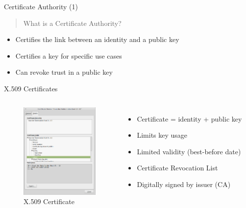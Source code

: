 \documentclass[aspectratio=169]{beamer}
\begin{document}
    \begin{frame}{Certificate Authority (1)}
        \begin{quote}
            \centering
            What is a Certificate Authority?
        \end{quote}
        \pause
        \begin{itemize}
            \item Certifies the link between an identity and a public key
            \pause
            \item Certifies a key for specific use cases
            \pause
            \item Can revoke trust in a public key
        \end{itemize}
    \end{frame}

    \begin{frame}{X.509 Certificates}
        \begin{columns}[T,onlytextwidth]
                \begin{figure}[h]
                    \centering
                    \includegraphics[width=110pt,keepaspectratio]{images/staat_der_nederlanden_root_ca.png}
                    \caption{X.509 Certificate}
                \end{figure}
                \begin{itemize}
                    \pause
                    \item Certificate = identity + public key
                    \item Limits key usage
                    \item Limited validity (best-before date)
                    \item Certificate Revocation List
                    \item \alert{Digitally signed by issuer (CA)}
                \end{itemize}
        \end{columns}
    \end{frame}
\end{document}
